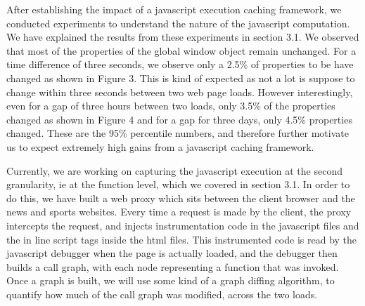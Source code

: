 After establishing the impact of a javascript execution caching framework, we conducted
experiments to understand the nature of the javascript computation. We have explained the
results from these experiments in section 3.1. 
We observed that most of the properties of the global window object remain unchanged.
For a time difference of three seconds, we observe only a 2.5\% of properties to be have
changed as shown in Figure 3. This is kind of expected as not a lot is suppose to change within three seconds 
between two web page loads. However interestingly, even for a gap of three hours between
two loads, only 3.5\% of the properties changed as shown in Figure 4 and for a gap
 for three days, only 4.5\% 
properties changed. These are the 95\% percentile numbers, and therefore 
further motivate us to expect extremely high gains from a javascript caching
framework. 


Currently, we are working on capturing the javascript execution at the second granularity,
ie at the function level, which we covered in section 3.1. In order to do this, we have built
a web proxy which sits between the client browser and the news and sports websites. Every time 
a request is made by the client, the proxy intercepts the request, and injects instrumentation
code in the javascript files and the in line script tags inside the html files. 
This instrumented code is read by the javascript debugger when the page is actually loaded, and 
the debugger then builds a call graph, with each node representing a function that was invoked. 
Once a graph is built, we will use some kind of a graph diffing algorithm, to quantify
how much of the call graph was modified, across the two loads. 

